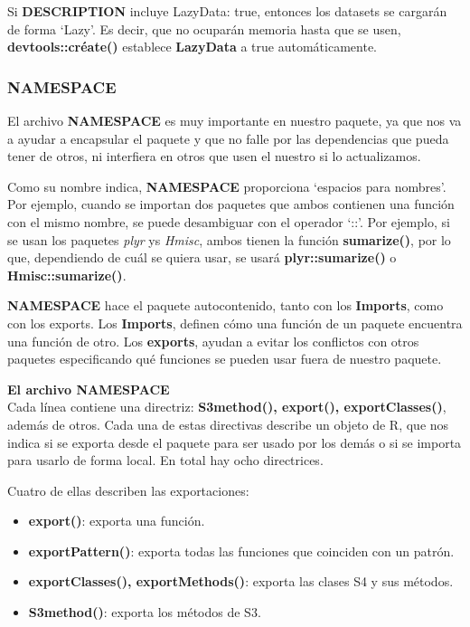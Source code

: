 Si \textbf{DESCRIPTION} incluye LazyData: true, entonces los datasets se cargar\'an de forma
\enquote*{Lazy}. Es decir, que no ocupar\'an memoria hasta que se usen, \textbf{devtools::cr\'eate()} establece
\textbf{LazyData} a true autom\'aticamente.

\subsubsection{NAMESPACE}

El archivo \textbf{NAMESPACE} es muy importante en nuestro paquete, ya que nos va a ayudar a
encapsular el paquete y que no falle por las dependencias que pueda tener de otros, ni
interfiera en otros que usen el nuestro si lo actualizamos.

Como su nombre indica, \textbf{NAMESPACE} proporciona \enquote*{espacios para nombres}. Por ejemplo,
cuando se importan dos paquetes que ambos contienen una funci\'on con el mismo nombre,
se puede desambiguar con el operador \enquote*{::}. Por ejemplo, si se usan los paquetes \textit{plyr} ys
\textit{Hmisc}, ambos tienen la funci\'on \textbf{sumarize()}, por lo que, dependiendo de cu\'al se quiera usar,
se usar\'a \textbf{plyr::sumarize()} o \textbf{Hmisc::sumarize()}.

\textbf{NAMESPACE} hace el paquete autocontenido, tanto con los \textbf{Imports}, como con los
exports. Los \textbf{Imports}, definen c\'omo una funci\'on de un paquete encuentra una funci\'on de
otro. Los \textbf{exports}, ayudan a evitar los conflictos con otros paquetes especificando qu\'e
funciones se pueden usar fuera de nuestro paquete.

\textbf{El archivo NAMESPACE}\\

Cada l\'inea contiene una directriz: \textbf{S3method(), export(), exportClasses()}, adem\'as de otros.
Cada una de estas directivas describe un objeto de R, que nos indica si se exporta desde
el paquete para ser usado por los dem\'as o si se importa para usarlo de forma local.
En total hay ocho directrices. 

Cuatro de ellas describen las exportaciones:

\begin{itemize}
    \item \textbf{ export()}: exporta una funci\'on.
    \item \textbf{ exportPattern()}: exporta todas las funciones que coinciden con un patr\'on.
    \item \textbf{ exportClasses(), exportMethods()}: exporta las clases S4 y sus m\'etodos.
    \item \textbf{ S3method()}: exporta los m\'etodos de S3.
\end{itemize}

